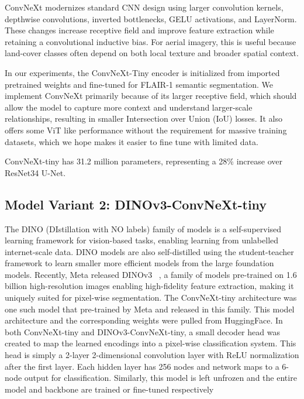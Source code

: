 \documentclass{article}
\begin{document}
ConvNeXt modernizes standard CNN design using larger convolution kernels, depthwise convolutions, inverted bottlenecks, GELU activations, and LayerNorm. These changes increase receptive field and improve feature extraction while retaining a convolutional inductive bias. For aerial imagery, this is useful because land-cover classes often depend on both local texture and broader spatial context.

In our experiments, the ConvNeXt-Tiny encoder is initialized from imported pretrained weights and fine-tuned for FLAIR-1 semantic segmentation. We implement ConvNeXt primarily because of its larger receptive field, which should allow the model to capture more context and understand larger-scale relationships, resulting in smaller Intersection over Union (IoU) losses. It also offers some ViT like performance without the requirement for massive training datasets, which we hope makes it easier to fine tune with limited data. 

ConvNeXt-tiny has 31.2 million parameters, representing a 28\% increase over ResNet34 U-Net.

\subsection{Model Variant 2: DINOv3-ConvNeXt-tiny}


The DINO (DIstillation with NO labels) family of models is a self-supervised learning framework for vision-based tasks, enabling learning from unlabelled internet-scale data. DINO models are also self-distilled using the student-teacher framework to learn smaller more efficient models from the large foundation models. Recently, Meta released DINOv3 ~\cite{simeoni2025dinov3}, a family of models pre-trained on 1.6 billion high-resolution images enabling high-fidelity feature extraction, making it uniquely suited for pixel-wise segmentation. The ConvNeXt-tiny architecture was one such model that pre-trained by Meta and released in this family. This model architecture and the corresponding weights were pulled from HuggingFace. In both ConvNeXt-tiny and DINOv3-ConvNeXt-tiny, a small decoder head was created to map the learned encodings into a pixel-wise classification system. This head is simply a 2-layer 2-dimensional convolution layer with ReLU normalization after the first layer. Each hidden layer has 256 nodes and network maps to a 6-node output for classification. Similarly, this model is left unfrozen and the entire model and backbone are trained or fine-tuned respectively
\end{document}
